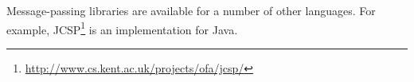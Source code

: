 Message-passing libraries are available for a number of other languages.  For
example, JCSP\footnote{\url{http://www.cs.kent.ac.uk/projects/ofa/jcsp/}} is
an implementation  for Java.








\exercises








